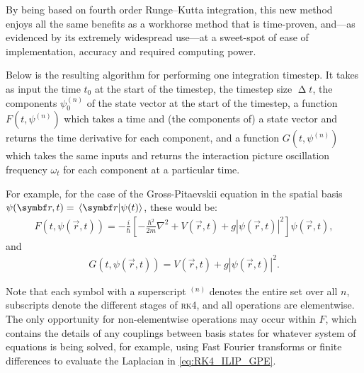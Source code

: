 By being based on fourth order Runge--Kutta integration, this new method enjoys all the same benefits as a workhorse method that is time-proven, and---as evidenced by its extremely widespread use---at a sweet-spot of ease of implementation, accuracy and required computing power.

Below is the resulting algorithm for performing one integration timestep. It takes as input the time $t_0$ at the start of the timestep, the timestep size $\upDelta t$, the components $\psi_0^{(n)}$ of the state vector at the start of the timestep, a function $F(t, \psi^{(n)})$ which takes a time and (the components of) a state vector and returns the time derivative for each component, and a function $G(t, \psi^{(n)})$ which takes the same inputs and returns the interaction picture oscillation frequency $\omega_{t}$ for each component at a particular time.

For example, for the case of the Gross-Pitaevskii equation in the spatial basis $\psi(\vec r, t) = \braket{\vec r}{\psi(t)}$, these would be:
\begin{align}\label{eq:RK4_ILIP_GPE}
F(t, \psi(\vec r, t)) = -\frac i \hbar\left[-\frac{\hbar^2}{2m}\nabla^2 + V(\vec r, t) + g|\psi(\vec r, t)|^2\right]\psi(\vec r, t),
\end{align}
and
\begin{align}
G(t, \psi(\vec r, t)) = V(\vec r, t) + g|\psi(\vec r, t)|^2.
\end{align}

Note that each symbol with a superscript $^{(n)}$ denotes the entire set over all $n$, subscripts denote the different stages of \textsc{rk4}, and all operations are elementwise. The only opportunity for non-elementwise operations may occur within $F$, which contains the details of any couplings between basis states for whatever system of equations is being solved, for example, using Fast Fourier transforms or finite differences to evaluate the Laplacian in \eqref{eq:RK4_ILIP_GPE}.


